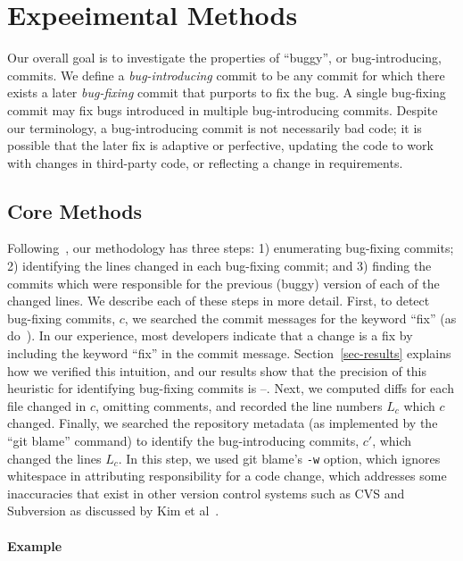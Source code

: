 \section{Expeeimental Methods}
\label{sec:method}

Our overall goal is to investigate the properties of ``buggy'', or
bug-introducing, commits. We define a \emph{bug-introducing} commit to be any
commit for which there exists a later \emph{bug-fixing} commit that purports to
fix the bug. A single bug-fixing commit may fix bugs introduced in multiple
bug-introducing commits. Despite our terminology, a bug-introducing commit is
not necessarily bad code; it is possible that the later fix is adaptive or
perfective, updating the code to work with changes in third-party code, or
reflecting a change in requirements.

\subsection{Core Methods}

Following~\cite{sliwerski-msr-2005}, our methodology has three steps: 1)
enumerating bug-fixing commits; 2) identifying the lines changed in each
bug-fixing commit; and 3) finding the commits which were responsible for the
previous (buggy) version of each of the changed lines. We describe each of these
steps in more detail. First, to detect bug-fixing commits, $c$, we searched the
commit messages for the keyword ``fix'' (as do~\cite{smallCommits05}).  In our
experience, most developers indicate that a change is a fix by including the
keyword ``fix'' in the commit message. Section~\ref{sec-results} explains how we
verified this intuition, and our results show that the precision of this
heuristic for identifying bug-fixing commits is \postP--\linuxP.  Next, we
computed diffs for each file changed in $c$, omitting comments, and recorded the
line numbers $L_c$ which $c$ changed. Finally, we searched the repository
metadata (as implemented by the ``git blame'' command) to identify the
bug-introducing commits, $c'$, which changed the lines $L_c$. In this step, we
used git blame's {\tt -w} option, which ignores whitespace in attributing
responsibility for a code change, which addresses some inaccuracies that exist
in other version control systems such as CVS and Subversion as discussed by Kim
et al~\cite{2006-automatic}.

\paragraph{Example}

